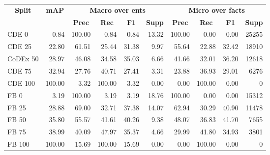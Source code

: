 \begin{tabular}{| l | r | r | r | r | r | r | r | r | r |}
    \hline
    
    \multicolumn{1}{|c|}{\textbf{Split}} &
    \multicolumn{1}{|c|}{\textbf{mAP}} &
    \multicolumn{4}{|c|}{\textbf{Macro over ents}} &
    \multicolumn{4}{|c|}{\textbf{Micro over facts}} \\
    
    \multicolumn{1}{|c|}{} &
    \multicolumn{1}{|c|}{} &
    \multicolumn{1}{|c|}{\textbf{Prec}} &
    \multicolumn{1}{|c|}{\textbf{Rec}} &
    \multicolumn{1}{|c|}{\textbf{F1}} &
    \multicolumn{1}{|c|}{\textbf{Supp}} &
    \multicolumn{1}{|c|}{\textbf{Prec}} &
    \multicolumn{1}{|c|}{\textbf{Rec}} &
    \multicolumn{1}{|c|}{\textbf{F1}} &
    \multicolumn{1}{|c|}{\textbf{Supp}} \\
    
    \hline \hline
    
    CDE 0 & 0.84 &
    100.00 & 0.84 & 0.84 & \num{13.32} &
    100.00 & 0.00 & 0.00 & \num{25255} \\
    
    CDE 25 & 22.80 &
    61.51 & 25.44 & 31.38 & \num{9.97} &
    55.64 & 22.88 & 32.42 & \num{18910} \\
    
    CoDEx 50 & 28.97 &
    46.08 & 34.58 & 35.03 & \num{6.66} &
    41.66 & 32.01 & 36.20 & \num{12618} \\
    
    CDE 75 & 32.94 &
    27.76 & 40.71 & 27.41 & \num{3.31} &
    23.88 & 36.93 & 29.01 & \num{6276} \\
    
    CDE 100 & 100.00 &
    3.32 & 100.00 & 3.32 & \num{0.00} &
    0.00 & 100.00 & 0.00 & \num{0} \\
    
    \hline
    
    FB 0 & 3.19 &
    100.00 & 3.19 & 3.19 & \num{18.76} &
    100.00 & 0.00 & 0.00 & \num{15312} \\
    
    FB 25 & 28.88 &
    69.00 & 32.71 & 37.38 & \num{14.07} &
    62.94 & 30.29 & 40.90 & \num{11478} \\
    
    FB 50 & 35.80 &
    55.57 & 41.61 & 40.26 & \num{9.38} &
    48.07 & 36.83 & 41.70 & \num{7655} \\
    
    FB 75 & 38.99 &
    40.09 & 47.97 & 35.37 & \num{4.66} &
    29.99 & 41.80 & 34.93 & \num{3801} \\
    
    FB 100 & 100.00 &
    15.69 & 100.00 & 15.69 & \num{0.00} &
    0.00 & 100.00 & 0.00 & \num{0} \\
    
    \hline
\end{tabular}
